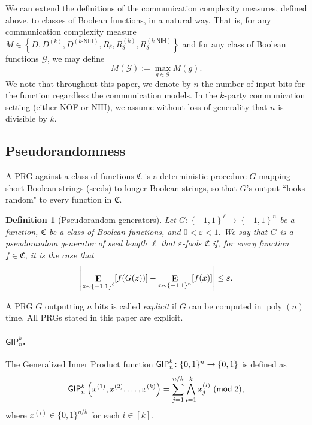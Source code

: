 \documentclass[10pt,a4paper]{article}
\newtheorem{definition}[theorem]{Definition}
\DeclareMathOperator*\Exp{{\bf E}}
\newcommand{\boolpm}{\left\{-1,1\right\}}
\newcommand{\GIP}{{\sf GIP}}
\newcommand{\abs}[1]{\left|#1\right|}
\newcommand{\cprn}[1]{\!\left(#1\right)}
\newcommand{\csqbra}[1]{\!\left[#1\right]}
\newcommand{\brkts}[1]{\left\{#1\right\}}
\newcommand{\poly}{\operatorname{poly}}
\begin{document}
    We can extend the definitions of the communication complexity measures, defined above, to classes of Boolean functions, in a natural way. That is, for any communication complexity measure $M\in\brkts{D,D^{(k)},D^{(k\text{-}\mathsf{NIH})},R_\delta,R_\delta^{(k)},R_\delta^{(k\text{-}\mathsf{NIH})}}$ and for any class of Boolean functions $\mathcal{G}$, we may define
    \[
        M\cprn{\mathcal{G}}:=\max_{g\in\mathcal{G}}M\cprn{g}.
    \]
	We note that throughout this paper, we denote by $n$ the number of input bits for the function regardless the communication models. In the $k$-party communication setting (either NOF or NIH), we assume without loss of generality that $n$ is divisible by $k$.
	

\setcounter{theorem}{16}
	\subsection{Pseudorandomness}
	
	A PRG against a class of functions $\mathfrak{C}$ is a deterministic procedure $G$ mapping short Boolean strings (seeds) to longer Boolean strings, so that $G$'s output ``looks random" to every function in $\mathfrak{C}$.
	
    \begin{definition}[Pseudorandom generators]
    	Let $G\colon\boolpm^{\ell}\to\boolpm^n$ be a function, $\mathfrak{C}$ be a class of Boolean functions, and $0<\varepsilon<1$. We say that $G$ is a \emph{pseudorandom generator of seed length $\ell$ that $\varepsilon$-fools $\mathfrak{C}$} if, for every function $f\in\mathfrak{C}$, it is the case that
    	\[
    	    \abs{\Exp_{z\sim\boolpm^\ell}\csqbra{f\cprn{G\cprn{z}}}-
    	    \Exp_{x\sim\boolpm^n}\csqbra{f\cprn{x}}}\leq\varepsilon.
    	\]
    \end{definition}
	
	A PRG $G$ outputting $n$ bits is called \emph{explicit} if $G$ can be computed in $\poly(n)$ time. All PRGs stated in this paper are explicit.
	

	\paragraph{$\mathsf{GIP}^k_n$.}
	
	The Generalized Inner Product function $\GIP^k_{n}\colon \{0,1\}^{n} \to \{0,1\}$ is defined as
	\[
	    \GIP_{n}^{k}\left(x^{(1)},x^{(2)},\dots,x^{(k)}\right) = \sum_{j=1}^{n/k} \bigwedge_{i=1}^{k} x_{j}^{(i)}~(\mathsf{mod}\;2),
	\]
	where $x^{(i)}\in \{0,1\}^{n/k}$ for each $i\in [k]$.
\end{document}
